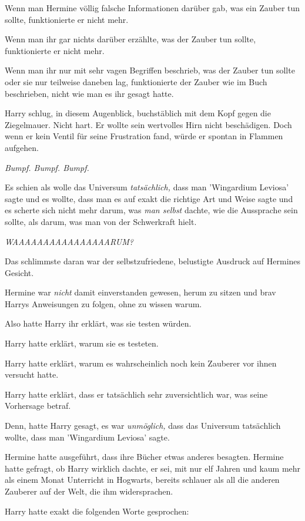 {Wenn man Hermine völlig falsche Informationen darüber gab, was ein Zauber tun sollte, funktionierte er nicht mehr.

Wenn man ihr gar nichts darüber erzählte, was der Zauber tun sollte, funktionierte er nicht mehr.

Wenn man ihr nur mit sehr vagen Begriffen beschrieb, was der Zauber tun sollte oder sie nur teilweise daneben lag, funktionierte der Zauber wie im Buch beschrieben, nicht wie man es ihr gesagt hatte.

Harry schlug, in diesem Augenblick, buchstäblich mit dem Kopf gegen die Ziegelmauer. Nicht hart. Er wollte sein wertvolles Hirn nicht beschädigen. Doch wenn er kein Ventil für seine Frustration fand, würde er spontan in Flammen aufgehen.

\emph{Bumpf. Bumpf. Bumpf.}

Es schien als wolle das Universum \emph{tatsächlich,} dass man 'Wingardium Leviosa' sagte und es wollte, dass man es auf exakt die richtige Art und Weise sagte und es scherte sich nicht mehr darum, was \emph{man selbst} dachte, wie die Aussprache sein sollte, als darum, was man von der Schwerkraft hielt.

\emph{WAAAAAAAAAAAAAAAARUM?}

Das schlimmste daran war der selbstzufriedene, belustigte Ausdruck auf Hermines Gesicht.

Hermine war \emph{nicht} damit einverstanden gewesen, herum zu sitzen und brav Harrys Anweisungen zu folgen, ohne zu wissen warum.

Also hatte Harry ihr erklärt, was sie testen würden.

Harry hatte erklärt, warum sie es testeten.

Harry hatte erklärt, warum es wahrscheinlich noch kein Zauberer vor ihnen versucht hatte.

Harry hatte erklärt, dass er tatsächlich sehr zuversichtlich war, was seine Vorhersage betraf.

Denn, hatte Harry gesagt, es war \emph{unmöglich,} dass das Universum tatsächlich wollte, dass man 'Wingardium Leviosa' sagte.

Hermine hatte ausgeführt, dass ihre Bücher etwas anderes besagten. Hermine hatte gefragt, ob Harry wirklich dachte, er sei, mit nur elf Jahren und kaum mehr als einem Monat Unterricht in Hogwarts, bereits schlauer als all die anderen Zauberer auf der Welt, die ihm widersprachen.

Harry hatte exakt die folgenden Worte gesprochen:

}
